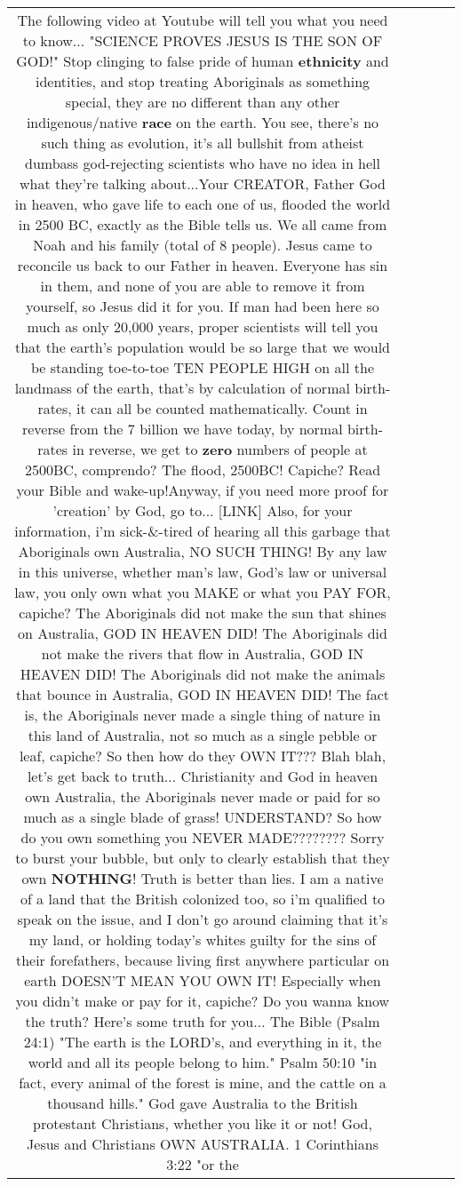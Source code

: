 \documentclass[11pt]{article}
\newlength\mylength
\begin{document}
\begin{center}
\begin{longtable}{|C{.65\mylength}|C{.30\mylength}|C{.12\mylength}|C{.12\mylength}|C{.12\mylength}|}
  \small The following video at Youtube will tell you what you need to know... "SCIENCE PROVES JESUS IS THE SON OF GOD!" Stop clinging to false pride of human \textbf{ethnicity} and identities, and stop treating Aboriginals as something special, they are no different than any other indigenous/native \textbf{race} on the earth. You see, there's no such thing as evolution, it's all bullshit from atheist dumbass god-rejecting scientists who have no idea in hell what they're talking about...Your CREATOR, Father God in heaven, who gave life to each one of us, flooded the world in 2500 BC, exactly as the Bible tells us. We all came from Noah and his family (total of 8 people). Jesus came to reconcile us back to our Father in heaven. Everyone has sin in them, and none of you are able to remove it from yourself, so Jesus did it for you. If man had been here so much as only 20,000 years, proper scientists will tell you that the earth's population would be so large that we would be standing toe-to-toe TEN PEOPLE HIGH on all the landmass of the earth, that's by calculation of normal birth-rates, it can all be counted mathematically. Count in reverse from the 7 billion we have today, by normal birth-rates in reverse, we get to \textbf{zero} numbers of people at 2500BC, comprendo? The flood, 2500BC! Capiche? Read your Bible and wake-up!Anyway, if you need more proof for 'creation' by God, go to...  [LINK] Also, for your information, i'm sick-\&-tired of hearing all this garbage that Aboriginals own Australia, NO SUCH THING! By any law in this universe, whether man's law, God's law or universal law, you only own what you MAKE or what you PAY FOR, capiche? The Aboriginals did not make the sun that shines on Australia, GOD IN HEAVEN DID! The Aboriginals did not make the rivers that flow in Australia, GOD IN HEAVEN DID! The Aboriginals did not make the animals that bounce in Australia, GOD IN HEAVEN DID! The fact is, the Aboriginals never made a single thing of nature in this land of Australia, not so much as a single pebble or leaf, capiche? So then how do they OWN IT??? Blah blah, let's get back to truth... Christianity and God in heaven own Australia, the Aboriginals never made or paid for so much as a single blade of grass! UNDERSTAND? So how do you own something you NEVER MADE???????? Sorry to burst your bubble, but only to clearly establish that they own \textbf{NOTHING}! Truth is better than lies. I am a native of a land that the British colonized too, so i'm qualified to speak on the issue, and I don't go around claiming that it's my land, or holding today's whites guilty for the sins of their forefathers, because living first anywhere particular on earth DOESN'T MEAN YOU OWN IT! Especially when you didn't make or pay for it, capiche? Do you wanna know the truth? Here's some truth for you... The Bible (Psalm 24:1) "The earth is the LORD's, and everything in it, the world and all its people belong to him." Psalm 50:10 "in fact, every animal of the forest is mine, and the cattle on a thousand hills." God gave Australia to the British protestant Christians, whether you like it or not! God, Jesus and Christians OWN AUSTRALIA. 1 Corinthians 3:22 "or the 
\end{longtable}
\end{center}
\end{document}
